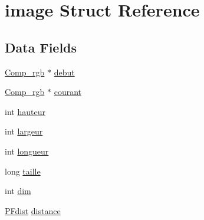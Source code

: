 \hypertarget{structimage}{\section{image Struct Reference}
\label{structimage}
}
\subsection*{Data Fields}
\begin{DoxyCompactItemize}
\item 
\hyperlink{image_8c_a55daf8e5c5064d89aecb30ff9550cdae}{Comp\-\_\-rgb} $\ast$ \hyperlink{structimage_a110ddf3326fbde4ebd40ba29fd7a1fbc}{debut}
\item 
\hyperlink{image_8c_a55daf8e5c5064d89aecb30ff9550cdae}{Comp\-\_\-rgb} $\ast$ \hyperlink{structimage_af818438fb3c67dd196511ae5acabc100}{courant}
\item 
int \hyperlink{structimage_a5e94a2f98c16e8b6860f95c99da1c0d3}{hauteur}
\item 
int \hyperlink{structimage_a74f0f2591e5f65bf792b2c3c67817d78}{largeur}
\item 
int \hyperlink{structimage_a99c1a2326077453a39e283a1dd9ca73e}{longueur}
\item 
long \hyperlink{structimage_aea7a6840da8c13886826ae0e87df1508}{taille}
\item 
int \hyperlink{structimage_a70b5e28b5bc3d1b63a7435c5fe50b837}{dim}
\item 
\hyperlink{image_8h_a7064539af2f359fdf499f2f7c06aefb2}{P\-Fdist} \hyperlink{structimage_ae7c15b602811667eb91edaf897fbae40}{distance}
\end{DoxyCompactItemize}


